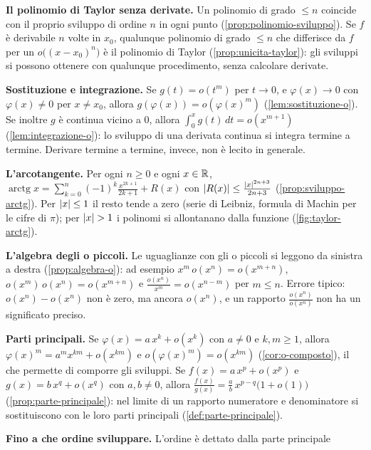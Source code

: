 \begin{puntichiave}
\item \textbf{Il polinomio di Taylor senza derivate.} Un polinomio di grado $\le n$
coincide con il proprio sviluppo di ordine $n$ in ogni punto
(\cref{prop:polinomio-sviluppo}). Se $f$ è derivabile $n$ volte in $x_{0}$, qualunque
polinomio di grado $\le n$ che differisce da $f$ per un $o\bigl((x-x_{0})^{n}\bigr)$ è il
polinomio di Taylor (\cref{prop:unicita-taylor}): gli sviluppi si possono ottenere con
qualunque procedimento, senza calcolare derivate.
\item \textbf{Sostituzione e integrazione.} Se $g(t)=o(t^{m})$ per $t\to0$, e $\varphi(x)\to0$
con $\varphi(x)\neq0$ per $x\neq x_{0}$, allora $g(\varphi(x))=o(\varphi(x)^{m})$
(\cref{lem:sostituzione-o}). Se inoltre $g$ è continua vicino a $0$, allora
$\int_{0}^{x}g(t)\,dt=o(x^{m+1})$
(\cref{lem:integrazione-o}): lo sviluppo di una derivata continua si integra termine a
termine. Derivare termine a termine, invece, non è lecito in generale.
\item \textbf{L'arcotangente.} Per ogni $n\ge0$ e ogni $x\in\mathbb{R}$,
$\operatorname{arctg}x=\sum_{k=0}^{n}(-1)^{k}\frac{x^{2k+1}}{2k+1}+R(x)$ con
$\lvert R(x)\rvert\le\frac{\lvert x\rvert^{2n+3}}{2n+3}$ (\cref{prop:sviluppo-arctg}). Per $\lvert x\rvert\le1$ il resto
tende a zero (serie di Leibniz, formula di Machin per le cifre di $\pi$); per $\lvert x\rvert>1$ i
polinomi si allontanano dalla funzione (\cref{fig:taylor-arctg}).
\item \textbf{L'algebra degli o piccoli.} Le uguaglianze con gli o piccoli si leggono
da sinistra a destra (\cref{prop:algebra-o}): ad esempio $x^{m}\,o(x^{n})=o(x^{m+n})$,
$o(x^{m})\,o(x^{n})=o(x^{m+n})$ e $\frac{o(x^{n})}{x^{m}}=o(x^{n-m})$ per $m\le n$. Errore tipico:
$o(x^{n})-o(x^{n})$ non è zero, ma ancora $o(x^{n})$, e un rapporto $\frac{o(x^{n})}{o(x^{n})}$
non ha un significato preciso.
\item \textbf{Parti principali.} Se $\varphi(x)=a\,x^{k}+o(x^{k})$ con $a\neq0$ e $k,m\ge1$, allora
$\varphi(x)^{m}=a^{m}x^{km}+o(x^{km})$ e $o(\varphi(x)^{m})=o(x^{km})$
(\cref{cor:o-composto}), il che permette di comporre gli sviluppi. Se
$f(x)=a\,x^{p}+o(x^{p})$ e $g(x)=b\,x^{q}+o(x^{q})$ con $a,b\neq0$, allora
$\frac{f(x)}{g(x)}=\frac ab\,x^{p-q}\bigl(1+o(1)\bigr)$ (\cref{prop:parte-principale}): nel limite
di un rapporto numeratore e denominatore si sostituiscono con le loro parti principali
(\cref{def:parte-principale}).
\item \textbf{Fino a che ordine sviluppare.} L'ordine è dettato dalla parte principale

\end{puntichiave}
